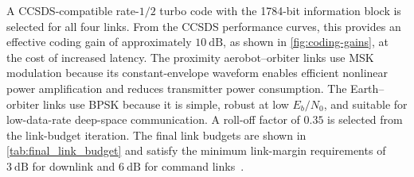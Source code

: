A CCSDS-compatible rate-\(1/2\) turbo code with the 1784-bit information block is selected for all four links. From the CCSDS performance curves, this provides an effective coding gain of approximately \(10~\mathrm{dB}\), as shown in \autoref{fig:coding-gains}, at the cost of increased latency. The proximity aerobot--orbiter links use MSK modulation because its constant-envelope waveform enables efficient nonlinear power amplification and reduces transmitter power consumption. The Earth--orbiter links use BPSK because it is simple, robust at low \(E_b/N_0\), and suitable for low-data-rate deep-space communication. A roll-off factor of \(0.35\) is selected from the link-budget iteration. The final link budgets are shown in \autoref{tab:final_link_budget} and satisfy the minimum link-margin requirements of \(3~\mathrm{dB}\) for downlink and \(6~\mathrm{dB}\) for command links~\cite{chen2006linkSystemDesign}.

